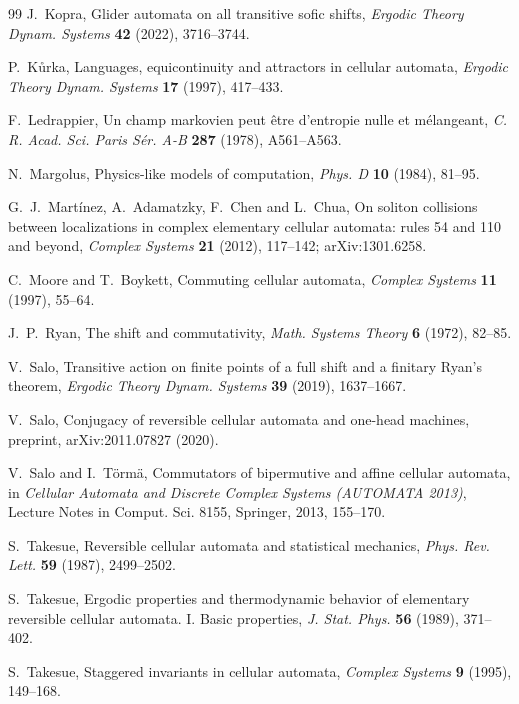 \begin{thebibliography}{99}
 J.~Kopra, Glider automata on all transitive sofic shifts, \emph{Ergodic Theory Dynam. Systems} \textbf{42} (2022), 3716--3744.

 P.~K\r{u}rka, Languages, equicontinuity and attractors in cellular automata, \emph{Ergodic Theory Dynam. Systems} \textbf{17} (1997), 417--433.

 F.~Ledrappier, Un champ markovien peut \^etre d'entropie nulle et m\'elangeant, \emph{C. R. Acad. Sci. Paris S\'er. A-B} \textbf{287} (1978), A561--A563.

 N.~Margolus, Physics-like models of computation, \emph{Phys. D} \textbf{10} (1984), 81--95.

 G.~J.~Mart\'inez, A.~Adamatzky, F.~Chen and L.~Chua, On soliton collisions between localizations in complex elementary cellular automata: rules 54 and 110 and beyond, \emph{Complex Systems} \textbf{21} (2012), 117--142; arXiv:1301.6258.

 C.~Moore and T.~Boykett, Commuting cellular automata, \emph{Complex Systems} \textbf{11} (1997), 55--64.

 J.~P.~Ryan, The shift and commutativity, \emph{Math. Systems Theory} \textbf{6} (1972), 82--85.

 V.~Salo, Transitive action on finite points of a full shift and a finitary Ryan's theorem, \emph{Ergodic Theory Dynam. Systems} \textbf{39} (2019), 1637--1667.

 V.~Salo, Conjugacy of reversible cellular automata and one-head machines, preprint, arXiv:2011.07827 (2020).

 V.~Salo and I.~T\"orm\"a, Commutators of bipermutive and affine cellular automata, in \emph{Cellular Automata and Discrete Complex Systems (AUTOMATA 2013)}, Lecture Notes in Comput. Sci. 8155, Springer, 2013, 155--170.

 S.~Takesue, Reversible cellular automata and statistical mechanics, \emph{Phys. Rev. Lett.} \textbf{59} (1987), 2499--2502.

 S.~Takesue, Ergodic properties and thermodynamic behavior of elementary reversible cellular automata. I. Basic properties, \emph{J. Stat. Phys.} \textbf{56} (1989), 371--402.

 S.~Takesue, Staggered invariants in cellular automata, \emph{Complex Systems} \textbf{9} (1995), 149--168.


\end{thebibliography}
